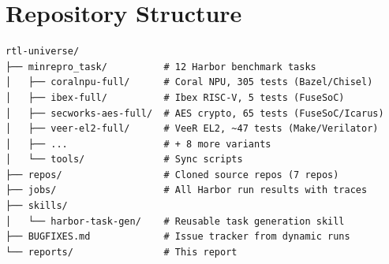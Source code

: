 \documentclass[11pt,a4paper]{article}
\begin{document}
\section{Repository Structure}

\begin{verbatim}
rtl-universe/
├── minrepro_task/          # 12 Harbor benchmark tasks
│   ├── coralnpu-full/      # Coral NPU, 305 tests (Bazel/Chisel)
│   ├── ibex-full/          # Ibex RISC-V, 5 tests (FuseSoC)
│   ├── secworks-aes-full/  # AES crypto, 65 tests (FuseSoC/Icarus)
│   ├── veer-el2-full/      # VeeR EL2, ~47 tests (Make/Verilator)
│   ├── ...                 # + 8 more variants
│   └── tools/              # Sync scripts
├── repos/                  # Cloned source repos (7 repos)
├── jobs/                   # All Harbor run results with traces
├── skills/
│   └── harbor-task-gen/    # Reusable task generation skill
├── BUGFIXES.md             # Issue tracker from dynamic runs
└── reports/                # This report
\end{verbatim}
\end{document}
